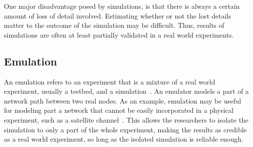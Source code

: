 One major disadvantage posed by simulations, is that there is always a certain amount of loss of detail involved. Estimating whether or not the lost details matter to the outcome of the simulation may be difficult. Thus, results of simulations are often at least partially validated in a real world experiments.    

\subsection{Emulation}

An emulation refers to an experiment that is a mixture of a real world experiment, usually a testbed, and a simulation~\cite{Allman99}. An emulator models a part of a network path between two real nodes. As an example, emulation may be useful for modeling part a network that cannot be easily incorporated in a physical experiment, such as a satellite channel~\cite{Allman99}. This allows the researchers to isolate the simulation to only a part of the whole experiment, making the results as credible as a real world experiment, so long as the isolated simulation is reliable enough.   